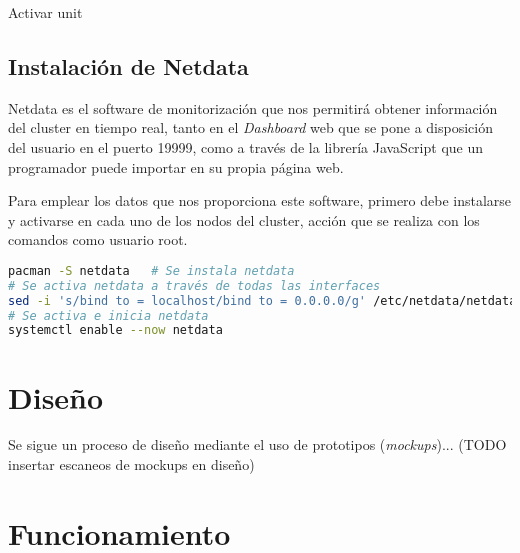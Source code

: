 Activar unit

\subsection{Instalación de Netdata}
Netdata es el software de monitorización que nos permitirá obtener información del cluster en tiempo real, tanto en el \textit{Dashboard} web que se pone a disposición del usuario en el puerto 19999, como a través de la librería JavaScript que un programador puede importar en su propia página web.

Para emplear los datos que nos proporciona este software, primero debe instalarse y activarse en cada uno de los nodos del cluster, acción que se realiza con los comandos como usuario root.

\begin{lstlisting}[language=bash]
pacman -S netdata   # Se instala netdata
# Se activa netdata a través de todas las interfaces
sed -i 's/bind to = localhost/bind to = 0.0.0.0/g' /etc/netdata/netdata.conf
# Se activa e inicia netdata
systemctl enable --now netdata

\end{lstlisting}


\section{Diseño}
Se sigue un proceso de diseño mediante el uso de prototipos (\textit{mockups})... (TODO insertar escaneos de mockups en diseño)

\section{Funcionamiento}
